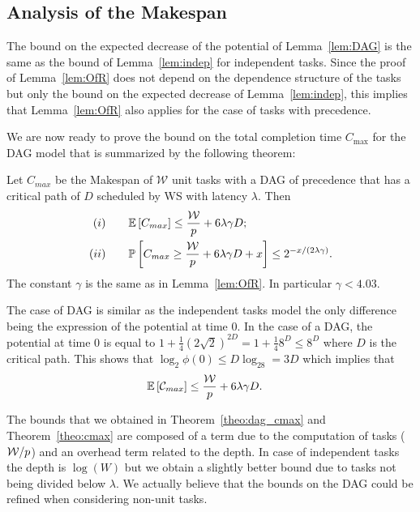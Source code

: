 \subsection{Analysis of the Makespan}
\label{subsec:analysisMakspan}



The bound on the expected decrease of the potential of
Lemma~\ref{lem:DAG} is the same  as the bound of Lemma~\ref{lem:indep}
for independent tasks. Since the proof of Lemma~\ref{lem:OfR} does not depend on the dependence
structure of the tasks but only the bound on the expected decrease of
Lemma~\ref{lem:indep}, this implies that Lemma~\ref{lem:OfR} also
applies for the case of tasks with precedence.

We are now ready to prove the bound on the total completion time
$C_{\max}$ for the DAG model that is summarized by the following theorem:
\begin{theorem}
  \label{theo:dag_cmax}
  Let $C_{max}$ be the Makespan of $\mathcal{W}$ unit tasks with a DAG
  of precedence that has a critical path of $D$ scheduled by WS with
  latency $\lambda$.  Then
  \begin{align*}
    (i)  \qquad &\esp{C_{max}} \leq \frac{\mathcal{W}}{p} +
                  6\lambda\gamma D; \\
    (ii) \qquad  &\Proba{ C_{max}  \ge \frac{\mathcal{W}}{p} +
                   6\lambda\gamma D  + x} \le
                   {2}^{-x/(2\lambda\gamma)}.
  \end{align*}
  The constant $\gamma$ is the same as in Lemma~\ref{lem:OfR}. In
  particular $\gamma<4.03$.
\end{theorem}
\begin{pf}
  The case of DAG is similar as the independent tasks model %
  the only difference being the expression of the potential at time $0$.
  In the case of a DAG, the potential at time $0$ is equal to
  $1+\frac14(2\sqrt{2})^{2D}=1+\frac148^D\le 8^D$ where $D$ is the
  critical path.  This shows that $\log_2\phi(0)\le D\log_28=3D$ which
  implies that
  \begin{align*}
    \esp{\mathcal{C}_{max}}
    & \leq \frac{\calW}{p} + 6\lambda\gamma D.
  \end{align*}
\end{pf}
The bounds that we obtained in Theorem~\ref{theo:dag_cmax} and Theorem~\ref{theo:cmax} are composed of
a term due to the computation of tasks ($\mathcal{W}/p$) and an overhead
term related to the depth.  In case of independent tasks the depth is
$\log(W)$ but we obtain a slightly better bound due to tasks not being
divided below $\lambda$.  We actually believe that the bounds on the DAG could be
refined when considering non-unit tasks.


